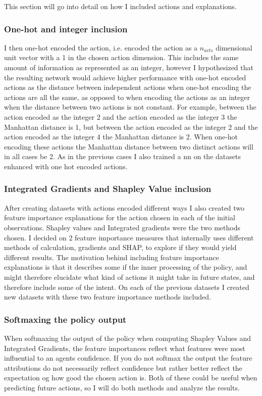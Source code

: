 \documentclass[UKenglish]{uiomasterthesis}
\begin{document}
This section will go into detail on how I included actions and explanations.

\subsubsection{One-hot and integer inclusion}
I then one-hot encoded the action, i.e. encoded the action as a $n_{acts}$ dimensional unit vector with a 1 in the chosen action dimension. This includes the same amount of information as represented as an integer, however I hypothesized that the resulting network would achieve higher performance with one-hot encoded actions as the distance between independent actions when one-hot encoding the actions are all the same, as opposed to when encoding the actions as an integer when the distance between two actions is not constant. For example, between the action encoded as the integer 2 and the action encoded as the integer 3 the Manhattan distance is 1, but between the action encoded as the integer 2 and the action encoded as the integer 4 the Manhattan distance is 2. When one-hot encoding these actions the Manhattan distance between two distinct actions will in all cases be 2. As in the previous cases I also trained a \ac{nn} on the datasets enhanced with one hot encoded actions.

\subsubsection{Integrated Gradients and Shapley Value inclusion}
After creating datasets with actions encoded different ways I also created two feature importance explanations for the action chosen in each of the initial observations. Shapley values and Integrated gradients were the two methods chosen. I decided on 2 feature importance measures that internally uses different methods of calculation, gradients and SHAP, to explore if they would yield different results. The motivation behind including feature importance explanations is that it describes some if the inner processing of the policy, and might therefore elucidate what kind of actions it might take in future states, and therefore include some of the intent. On each of the previous datasets I created new datasets with these two feature importance methods included.\\

\subsubsection{Softmaxing the policy output}
When softmaxing the output of the policy when computing Shapley Values and Integrated Gradients, the feature importances reflect what features were most influential to an agents confidence. If you do not softmax the output the feature attributions do not necessarily reflect confidence but rather better reflect the expectation og how good the chosen action is. Both of these could be useful when predicting future actions, so I will do both methods and analyze the results.
\end{document}
